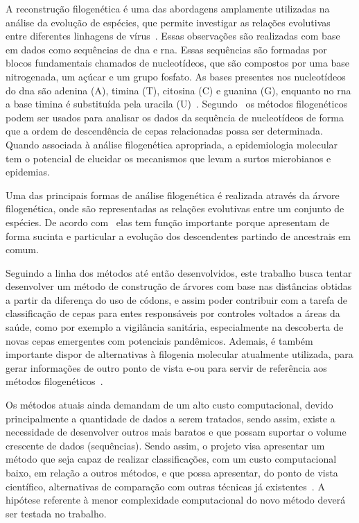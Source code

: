 A reconstrução filogenética é uma das abordagens amplamente utilizadas na análise da evolução de espécies, que permite investigar as relações evolutivas entre diferentes linhagens de vírus~\cite{sistematica_santos_2012, consideracoes_ribas_2006}. Essas observações são realizadas com base em dados como sequências de \gls{dna} e \gls{rna}. Essas sequências são formadas por blocos fundamentais chamados de nucleotídeos, que são compostos por uma base nitrogenada, um açúcar e um grupo fosfato. As bases presentes nos nucleotídeos do \gls{dna} são adenina (A), timina (T), citosina (C) e guanina (G), enquanto no \gls{rna} a base timina é substituída pela uracila (U)~\cite{alberts_molecular_2002,molecular_bernard_2022}.
Segundo~ os métodos filogenéticos podem ser usados para analisar os dados da sequência de nucleotídeos de forma que a ordem de descendência de cepas relacionadas possa ser determinada. Quando associada à análise filogenética apropriada, a epidemiologia molecular tem o potencial de elucidar os mecanismos que levam a surtos microbianos e epidemias.

Uma das principais formas de análise filogenética é realizada através da árvore filogenética, onde são representadas as relações evolutivas entre um conjunto de espécies. De acordo com~ elas tem função importante porque apresentam de forma sucinta e particular a evolução dos descendentes partindo de ancestrais em comum.

Seguindo a linha dos métodos até então desenvolvidos, este trabalho busca tentar desenvolver um método de construção de árvores com base nas distâncias obtidas a partir da diferença do uso de códons, e assim poder contribuir com a tarefa de classificação de cepas para entes responsáveis por controles voltados a áreas da saúde, como por exemplo a vigilância sanitária, especialmente na descoberta de novas cepas emergentes com potenciais pandêmicos. Ademais, é também importante dispor de alternativas à filogenia molecular atualmente utilizada, para gerar informações de outro ponto de vista e-ou para servir de referência aos métodos filogenéticos~\cite{virology_flint_2015}.

Os métodos atuais ainda demandam de um alto custo computacional, devido principalmente a quantidade de dados a serem tratados, sendo assim, existe a necessidade de desenvolver outros mais baratos e que possam suportar o volume crescente de dados (sequências).
Sendo assim, o projeto visa apresentar um método que seja capaz de realizar classificações, com um custo computacional baixo, em relação a outros métodos, e que possa apresentar, do ponto de vista científico, alternativas de comparação com outras técnicas já existentes~\cite{frank_chemistry_2017,gene_brow_2020}. A hipótese referente à menor complexidade computacional do novo método deverá ser testada no trabalho.

